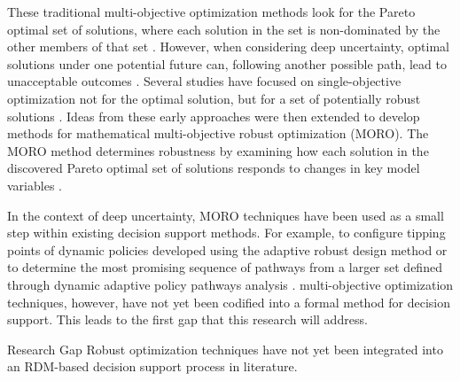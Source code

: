     These traditional multi-objective optimization methods look for the Pareto optimal set of solutions, where each solution in the set is non-dominated by the other members of that set \citep{Deb2006}. However, when considering deep uncertainty, optimal solutions under one potential future can, following another possible path, lead to unacceptable outcomes \citep{Deb2006, McInerney2012}. Several studies have focused on single-objective optimization not for the optimal solution, but for a set of potentially robust solutions \citep{Branke1998, Mulvey1995, Parmee2002, TsutsuiGosh1997}. Ideas from these early approaches were then extended to develop methods for mathematical multi-objective robust optimization (MORO). The MORO method determines robustness by examining how each solution in the discovered Pareto optimal set of solutions responds to changes in key model variables \citep{Deb2006}.
    
    In the context of deep uncertainty, MORO techniques have been used as a small step within existing decision support methods. For example, to configure tipping points of dynamic policies developed using the adaptive robust design method \citep{Hamarat2013} or to determine the most promising sequence of pathways from a larger set defined through dynamic adaptive policy pathways analysis \citep{Kwakkel2015}. multi-objective optimization techniques, however, have not yet been codified into a formal method for decision support. This leads to the first gap that this research will address. 
    
    \begin{researchbox}{Research Gap \thegapcounter}\label{gap-moro}
        Robust optimization techniques have not yet been integrated into an RDM-based decision support process in literature. 
    \end{researchbox}

